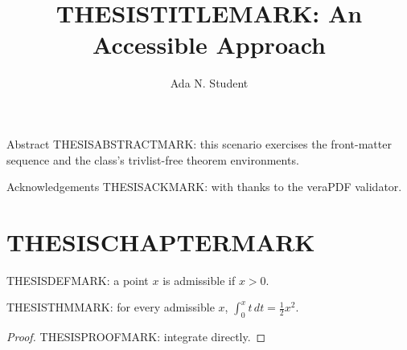 \documentclass{thesis}
\title{THESISTITLEMARK: An Accessible Approach}
\author{Ada N. Student}
\begin{document}
\makeUNRtitlepage
\makecopyrightpage
\committeeapprovalpage

\frontmatter

\begin{frontmatterpage}{Abstract}
THESISABSTRACTMARK: this scenario exercises the front-matter sequence and the
class's trivlist-free theorem environments.
\end{frontmatterpage}

\begin{frontmatterpage}{Acknowledgements}
THESISACKMARK: with thanks to the veraPDF validator.
\end{frontmatterpage}

\tableofcontents

\mainmatter

\chapter{THESISCHAPTERMARK}

\begin{definition}[Admissible]
THESISDEFMARK: a point $x$ is admissible if $x > 0$.
\end{definition}

\begin{theorem}\label{thm:scenario}
THESISTHMMARK: for every admissible $x$, $\int_0^x t \, dt = \tfrac{1}{2}x^2$.
\end{theorem}

\begin{proof}
THESISPROOFMARK: integrate directly.
\end{proof}
\end{document}
